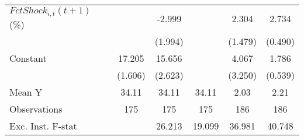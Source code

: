 {\begin{tabular}{l*{5}{c}}
\addlinespace
$ FctShock_{i,t}(t+1)$ (\%)&                     &      -2.999         &                     &       2.304         &       2.734\sym{***}\\
                    &                     &     (1.994)         &                     &     (1.479)         &     (0.490)         \\
\addlinespace
Constant            &      17.205\sym{***}&      15.656\sym{***}&                     &       4.067         &       1.786\sym{***}\\
                    &     (1.606)         &     (2.623)         &                     &     (3.250)         &     (0.539)         \\
\midrule
Mean Y              &       34.11         &       34.11         &       34.11         &        2.03         &        2.21         \\
Observations        &         175         &         175         &         175         &         186         &         186         \\
Exc. Inst. F-stat   &                     &      26.213         &      19.099         &      36.981         &      40.748         \\
\bottomrule
\end{tabular}
}
